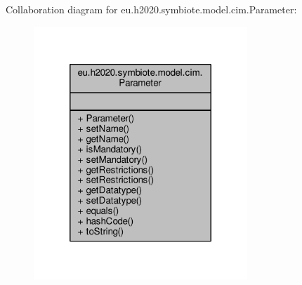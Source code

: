Collaboration diagram for eu.\+h2020.\+symbiote.\+model.\+cim.\+Parameter\+:\nopagebreak
\begin{figure}[H]
\begin{center}
\leavevmode
\includegraphics[width=228pt]{classeu_1_1h2020_1_1symbiote_1_1model_1_1cim_1_1Parameter__coll__graph}
\end{center}
\end{figure}
